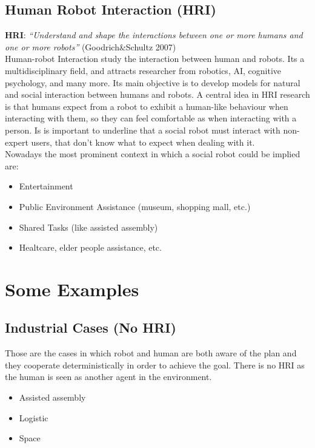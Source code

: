 \documentclass[pdftex,12pt,a4paper]{report}
\begin{document}
\subsection{Human Robot Interaction (HRI)}
\textbf{HRI}: \textit{“Understand and shape the interactions between
one or more humans and one or more robots”} (Goodrich\&Schultz 2007)\\
\newline
Human-robot Interaction study the interaction between human and robots. Its a multidisciplinary field, and attracts researcher from robotics, AI, cognitive psychology, and many more.
Its main objective is to develop models for natural and social interaction between humans and robots. 
A central idea in HRI research is that humans expect from a robot to exhibit a human-like behaviour when interacting with them, so they can feel comfortable as when interacting with a person. Is is important to underline that a social robot must interact with non-expert users, that don't know what to expect when dealing with it.\\

\noindent Nowadays the most prominent context in which a social robot could be implied are:
\begin{itemize}
\item Entertainment 
\item Public Environment Assistance (museum, shopping mall, etc.)
\item Shared Tasks (like assisted assembly)
\item Healtcare, elder people assistance, etc.
\end{itemize}

\section{Some Examples}
\subsection{Industrial Cases (No HRI)}
Those are the cases in which robot and human are both aware of the plan and they cooperate deterministically in order to achieve the goal. There is no HRI as the human is seen as another agent in the environment.
\begin{itemize}
\item Assisted assembly
\item Logistic 
\item Space
\end{itemize}
\end{document}
